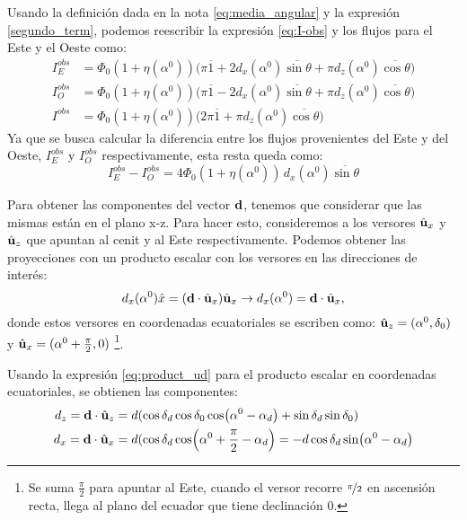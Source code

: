      Usando la definición dada en la nota \ref{eq:media_angular} y la expresión \ref{segundo_term}, podemos reescribir la expresión \ref{eq:I-obs} y los flujos para el Este y el Oeste como:
    \begin{align*}
    I^{obs}_E&= \Phi_0 (1+ \eta(\alpha^0)) \Big( \pi\overline{1} + 2d_x(\alpha^0)\overline{\sin\theta} + \pi d_z(\alpha^0)\overline{\cos\theta}  \Big) \\
        I^{obs}_O&= \Phi_0 (1+ \eta(\alpha^0)) \Big( \pi \overline{1} - 2d_x(\alpha^0)\overline{\sin\theta}   + \pi d_z(\alpha^0)\overline{\cos\theta} \Big) \\
        I^{obs}&= \Phi_0 (1+ \eta(\alpha^0)) \Big( 2\pi\overline{1} +\pi d_z(\alpha^0)\overline{\cos\theta}  \Big)
    \end{align*}
    Ya que se busca calcular la diferencia entre los flujos provenientes del Este y del Oeste, $I^{obs}_E $ y $  I^{obs}_O $ respectivamente, esta resta queda como:
    \begin{equation*}
        I^{obs}_E -  I^{obs}_O = 4 \Phi_0 (1+ \eta(\alpha^0)) \,  d_x(\alpha^0)\overline{\sin\theta}
    \end{equation*}

    Para obtener las componentes del vector $\bf{d}$, tenemos que considerar que las mismas están en el plano x-z. Para hacer esto, consideremos a los versores $\hat{\bf{u}}_x$ y $\hat{\bf{u}}_z$ que apuntan al cenit y al Este respectivamente. Podemos obtener las proyecciones con un producto escalar con los versores en las direcciones de interés:
    \begin{equation}
        d_x(\alpha^0) \hat{x} =  (\textbf{d}\cdot\hat{\bf{u}}_x)\hat{\bf{u}}_x \rightarrow d_x(\alpha^0) = \textbf{d}\cdot\hat{\bf{u}}_x,
    \end{equation}
    donde estos versores en coordenadas ecuatoriales se escriben como:
    $\hat{\bf{u}}_z = (\alpha^0,\delta_0 )$ y $ \hat{\bf{u}}_x = (\alpha^0 + \frac{\pi}{2},0)$ \footnote{Se suma  $\frac{\pi}{2}$ para apuntar al Este, cuando el versor recorre $\nicefrac{\pi}{2}$ en ascensión recta, llega al plano del ecuador que tiene declinación $0$.}.

    Usando la expresión \ref{eq:product_ud} para el producto escalar en coordenadas ecuatoriales, se obtienen las componentes:
    \begin{align*}
        d_z=\textbf{d}\cdot\hat{\bf{u}}_z &= d (\cos\delta_d \cos\delta_0 \cos(\alpha^0 - \alpha_d) + \sin\delta_d  \sin\delta_0)\\
        d_x=\textbf{d}\cdot\hat{\bf{u}}_x &= d (\cos\delta_d \cos(\alpha^0 +\frac{\pi}{2} - \alpha_d) 
        = -d\cos\delta_d \sin(\alpha^0  - \alpha_d)
    \end{align*}
    
